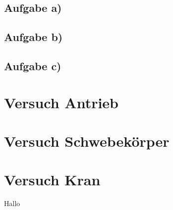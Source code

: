 \documentclass[11pt]{scrartcl}
\begin{document}
\subsection{Aufgabe a)}



\subsection{Aufgabe b)}

\subsection{Aufgabe c)}

\section{Versuch Antrieb}

\section{Versuch Schwebekörper}

\section{Versuch Kran}

Hallo
\end{document}
